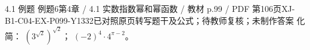 \par\noindent\begin{minipage}{\linewidth}
\begin{bankitem}{4.1 例题 例题6}{第4章 / 4.1 实数指数幂和幂函数 / 教材 p.99 / PDF 第106页}{XJ-B1-C04-EX-P099-Y1332}{已对照原页转写题干及公式；待教师复核；未制作答案}
化简：
$\left(3^{\sqrt2}\right)^{\sqrt2}$；
$(-2)^4\cdot4^{\pi-2}$。
\end{bankitem}
\end{minipage}\par\medskip
